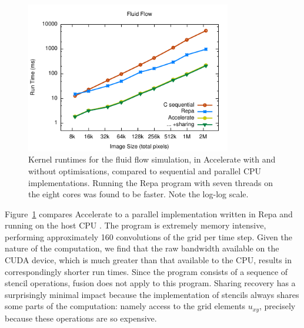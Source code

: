 \begin{figure}
    \begin{center}
        \includegraphics[width=0.8\textwidth]{images/sec-6/fluid/fluid}
    \end{center}
    \caption[Fluid flow simulation kernel benchmarks]{Kernel runtimes for the
        fluid flow simulation, in Accelerate with and without optimisations,
        compared to sequential and parallel CPU implementations. Running the
        Repa program with seven threads on the eight cores was found to be
        faster. Note the log-log scale.}
    \label{fig:fluid}
\end{figure}

Figure~\ref{fig:fluid} compares Accelerate to a parallel implementation written
in Repa and running on the host CPU \cite{Lippmeier:2012gx}. The program is
extremely memory intensive, performing approximately 160 convolutions of the
grid per time step. Given the nature of the computation, we find that the raw
bandwidth available on the CUDA device, which is much greater than that
available to the CPU, results in correspondingly shorter run times. Since the
program consists of a sequence of stencil operations, fusion does not apply to
this program. Sharing recovery has a surprisingly minimal impact because the
implementation of stencils always shares some parts of the computation: namely
access to the grid elements $u_{xy}$, precisely because these operations are so
expensive.


%


